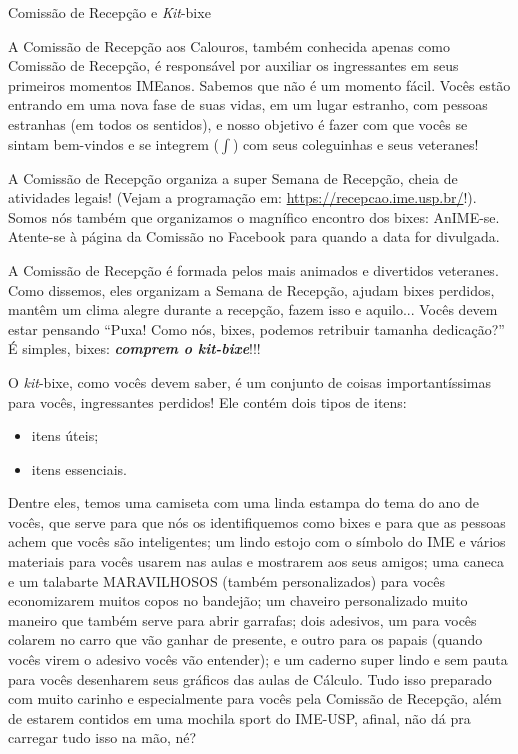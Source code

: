 \begin{secao}{Comissão de Recepção e \textit{Kit}-bixe}

A Comissão de Recepção aos Calouros, também conhecida apenas como Comissão de
Recepção, é responsável por auxiliar os ingressantes em seus primeiros momentos
IMEanos. Sabemos que não é um momento fácil. Vocês estão entrando em uma nova fase
de suas vidas, em um lugar estranho, com pessoas estranhas (em todos os sentidos),
e nosso objetivo é fazer com que vocês se sintam bem-vindos e se integrem
($\int$) com seus coleguinhas e seus veteranes!

A Comissão de Recepção organiza a super Semana de Recepção, cheia de atividades
legais! (Vejam a programação em: \url{https://recepcao.ime.usp.br/}!).
Somos nós também que organizamos o magnífico encontro dos bixes: AnIME-se.
Atente-se à página da Comissão no Facebook para quando a data for divulgada.

A Comissão de Recepção é formada pelos mais animados e divertidos veteranes. Como
dissemos, eles organizam a Semana de Recepção, ajudam bixes perdidos, mantêm um clima
alegre durante a recepção, fazem isso e aquilo...
Vocês devem estar pensando ``Puxa! Como nós, bixes, podemos retribuir
tamanha dedicação?'' É simples, bixes: {\bf\em comprem o \textit{kit}-bixe}!!!

O \textit{kit}-bixe, como vocês devem saber, é um conjunto de coisas
importantíssimas para vocês, ingressantes perdidos! Ele contém dois tipos de
itens:
\begin{itemize}
\item itens úteis;
\item itens essenciais.
\end{itemize} %
Dentre eles, temos uma camiseta com uma linda estampa do tema do ano de vocês,
que serve para que nós os identifiquemos como bixes e para que as pessoas
achem que vocês são inteligentes; um lindo estojo com o símbolo do IME e vários materiais
para vocês usarem nas aulas e mostrarem aos seus amigos; uma caneca e um talabarte MARAVILHOSOS
(também personalizados) para vocês economizarem muitos copos no bandejão; um
chaveiro personalizado muito maneiro que também serve para abrir garrafas;
dois adesivos, um para vocês colarem no carro que vão ganhar de presente, e outro
para os papais (quando vocês virem o adesivo vocês vão entender); e um caderno super
lindo e sem pauta para vocês desenharem seus gráficos das aulas de Cálculo. Tudo
isso preparado com muito carinho e especialmente para vocês pela Comissão de Recepção,
além de estarem contidos em uma mochila sport do IME-USP, afinal, não dá pra
carregar tudo isso na mão, né?


\end{secao}
